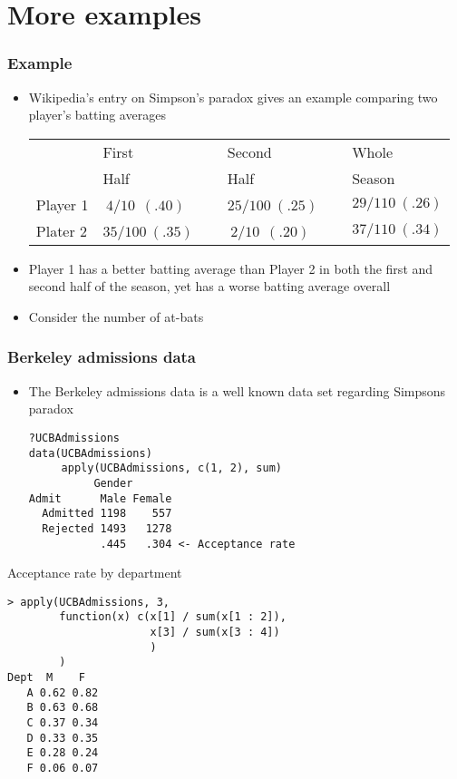 \documentclass[aspectratio=169]{beamer}
\begin{document}
\section{More examples}
\begin{frame}\frametitle{Example}
\begin{itemize}
\item Wikipedia's entry on Simpson's paradox gives an example
  comparing two player's batting averages
  \begin{center}
    \ttfamily
    \small
    \begin{tabular}{llll} 
               & First             & Second             & Whole  \\
               & Half              & Half               & Season \\ \hline
      Player 1 & $~4 / 10 ~~(.40)$ ~~& $25 / 100 ~(.25)$ ~~& $29 / 110 ~(.26)$ \\
      Plater 2 & $35 / 100 ~(.35)$ ~~& $~2 / 10~ ~(.20)$ ~~& $37 / 110 ~(.34)$ \\ \hline 
    \end{tabular}
    \normalfont
  \end{center}
\item Player 1 has a better batting average than Player 2 in both the
  first and second half of the season, yet has a worse batting average
  overall
\item Consider the number of at-bats 
\end{itemize}
\end{frame}

\begin{frame}[fragile]\frametitle{Berkeley admissions data}
\begin{itemize}
\item The Berkeley admissions data is a well known data set regarding Simpsons paradox
\begin{verbatim}
?UCBAdmissions
data(UCBAdmissions)
     apply(UCBAdmissions, c(1, 2), sum)
          Gender
Admit      Male Female
  Admitted 1198    557
  Rejected 1493   1278
           .445   .304 <- Acceptance rate
\end{verbatim}
\end{itemize}
\end{frame}

\begin{frame}[fragile]
Acceptance rate by department
\begin{verbatim}
> apply(UCBAdmissions, 3, 
        function(x) c(x[1] / sum(x[1 : 2]), 
                      x[3] / sum(x[3 : 4])
                      )
        ) 
Dept  M    F
   A 0.62 0.82
   B 0.63 0.68
   C 0.37 0.34
   D 0.33 0.35
   E 0.28 0.24
   F 0.06 0.07
\end{verbatim}
\end{frame}
\end{document}
